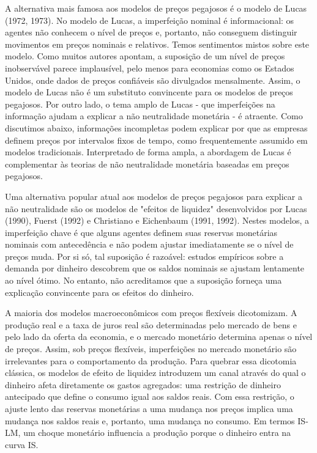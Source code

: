 \documentclass[a4paper,12pt]{article}[abntex2]
\begin{document}
A alternativa mais famosa aos modelos de preços pegajosos é o modelo de Lucas (1972, 1973). No modelo de Lucas, a imperfeição nominal é informacional: os agentes não conhecem o nível de preços e, portanto, não conseguem distinguir movimentos em preços nominais e relativos. Temos sentimentos mistos sobre este modelo. Como muitos autores apontam, a suposição de um nível de preços inobservável parece implausível, pelo menos para economias como os Estados Unidos, onde dados de preços confiáveis são divulgados mensalmente. Assim, o modelo de Lucas não é um substituto convincente para os modelos de preços pegajosos. Por outro lado, o tema amplo de Lucas - que imperfeições na informação ajudam a explicar a não neutralidade monetária - é atraente. Como discutimos abaixo, informações incompletas podem explicar por que as empresas definem preços por intervalos fixos de tempo, como frequentemente assumido em modelos tradicionais. Interpretado de forma ampla, a abordagem de Lucas é complementar às teorias de não neutralidade monetária baseadas em preços pegajosos.

Uma alternativa popular atual aos modelos de preços pegajosos para explicar a não neutralidade são os modelos de "efeitos de liquidez" desenvolvidos por Lucas (1990), Fuerst (1992) e Christiano e Eichenbaum (1991, 1992). Nestes modelos, a imperfeição chave é que alguns agentes definem suas reservas monetárias nominais com antecedência e não podem ajustar imediatamente se o nível de preços muda. Por si só, tal suposição é razoável: estudos empíricos sobre a demanda por dinheiro descobrem que os saldos nominais se ajustam lentamente ao nível ótimo. No entanto, não acreditamos que a suposição forneça uma explicação convincente para os efeitos do dinheiro.

A maioria dos modelos macroeconômicos com preços flexíveis dicotomizam. A produção real e a taxa de juros real são determinadas pelo mercado de bens e pelo lado da oferta da economia, e o mercado monetário determina apenas o nível de preços. Assim, sob preços flexíveis, imperfeições no mercado monetário são irrelevantes para o comportamento da produção. Para quebrar essa dicotomia clássica, os modelos de efeito de liquidez introduzem um canal através do qual o dinheiro afeta diretamente os gastos agregados: uma restrição de dinheiro antecipado que define o consumo igual aos saldos reais. Com essa restrição, o ajuste lento das reservas monetárias a uma mudança nos preços implica uma mudança nos saldos reais e, portanto, uma mudança no consumo. Em termos IS-LM, um choque monetário influencia a produção porque o dinheiro entra na curva IS.
\end{document}
